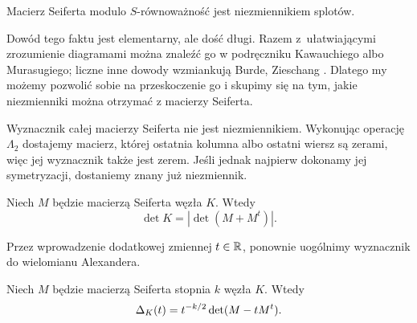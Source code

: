 \begin{proposition}
    Macierz Seiferta modulo $S$-równoważność jest niezmiennikiem splotów.
\end{proposition}

Dowód tego faktu jest elementarny, ale dość długi.
Razem z~ułatwiającymi zrozumienie diagramami można znaleźć go w podręczniku Kawauchiego \cite[s. 64]{kawauchi1996} albo Murasugiego; liczne inne dowody wzmiankują Burde, Zieschang \cite[s. 152]{burde2014}.
Dlatego my możemy pozwolić sobie na przeskoczenie go i skupimy się na tym, jakie niezmienniki można otrzymać z macierzy Seiferta.

Wyznacznik całej macierzy Seiferta nie jest niezmiennikiem.
Wykonując operację $\Lambda_2$ dostajemy macierz, której ostatnia kolumna albo ostatni wiersz są zerami, więc jej wyznacznik także jest zerem.
Jeśli jednak najpierw dokonamy jej symetryzacji, dostaniemy znany już niezmiennik.

\begin{proposition}
%
    Niech $M$ będzie macierzą Seiferta węzła $K$.
    Wtedy
    \begin{equation}
        \det K = |\det(M + M^t)|.
    \end{equation}
\end{proposition}

%
Przez wprowadzenie dodatkowej zmiennej $t \in \mathbb R$, ponownie uogólnimy wyznacznik do wielomianu Alexandera.

\begin{proposition}
    Niech $M$ będzie macierzą Seiferta stopnia $k$ węzła $K$.
    Wtedy
    \begin{equation}
        \Delta_K (t) = t^{-k/2}\det(M - tM^t).
    \end{equation}
\end{proposition}


